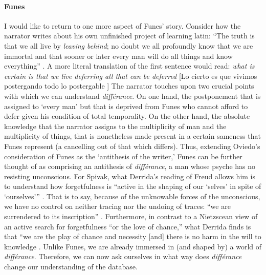 \paragraph{Funes}
I would like to return to one more aspect of Funes' story. Consider how the narrator writes about his own unfinished project of learning latin: ``The truth is that we all live by \textit{leaving behind}; no doubt we all profoundly know that we are immortal and that sooner or later every man will do all things and know everything'' \im \parencite[113]{Ker94:Fun}. A more literal translation of the first sentence would read: \textit{what is certain is that we live deferring all that can be deferred} [Lo cierto es que vivimos postergando todo lo postergable \parencite{Bor42:Fun}] The narrator touches upon two crucial points with which we can understand \textit{différance}. On one hand, the postponement that is assigned to `every man' but that is deprived from Funes who cannot afford to defer given his condition of total temporality. On the other hand, the absolute knowledge that the narrator assigns to the multiplicity of man and the multiplicity of things, that is nonetheless made present in a certain sameness that Funes represent (a cancelling out of that which differs). Thus, extending Oviedo's consideration of Funes as the `antithesis of the writer,' Funes can be further thought of as comprising an antithesis of \textit{différance}, a man whose psyche has no resisting unconscious. For Spivak, what Derrida's reading of Freud allows him is to understand how forgetfulness is ``active in the shaping of our `selves' in spite of `ourselves''' \parencite[xlv]{Der76:Of}. That is to say, because of the unknowable forces of the unconscious, we have no control on neither tracing nor the undoing of traces: ``we are surrendered to its inscription'' \parencite[xlv]{Der76:Of}. Furthermore, in contrast to a Nietzscean view of an active search for forgetfulness ``or the love of chance,'' what Derrida finds is that ``we are the play of chance and necessity [and] there is no harm in the will to knowledge \parencite[xliv]{Der76:Of}. Unlike Funes, we are already immersed in (and shaped by) a world of \textit{différance}. Therefore, we can now ask ourselves in what way does \textit{différance} change our understanding of the database.

